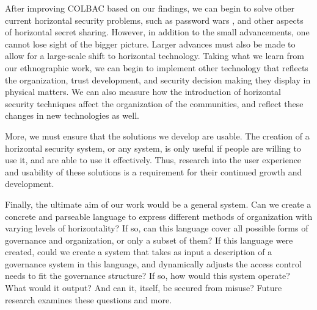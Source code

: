 After improving COLBAC based on our findings, we can begin to solve other
current horizontal security problems, such as password wars
\cite{kavada2020counterpublics}, and other aspects of horizontal secret sharing.
However, in addition to the small advancements, one cannot lose sight of the
bigger picture. Larger advances must also be made to allow for a large-scale
shift to horizontal technology. Taking what we learn from our ethnographic work,
we can begin to implement other technology that reflects the organization, trust
development, and security decision making they display in physical matters. We
can also measure how the introduction of horizontal security techniques affect
the organization of the communities, and reflect these changes in new
technologies as well.

More, we must ensure that the solutions we develop are usable. The creation of
a horizontal security system, or any system,  is only useful if people are
willing to use it, and are able to use it effectively. Thus, research into the
user experience and usability of these solutions is a requirement for their
continued growth and development.

Finally, the ultimate aim of our work would be a general system. Can we create a
concrete and parseable language to express different methods of organization
with varying levels of horizontality? If so, can this language cover all
possible forms of governance and organization, or only a subset of them? If this
language were created, could we create a system that takes as input a
description of a governance system in this language, and dynamically adjusts the
access control needs to fit the governance structure? If so, how would this
system operate? What would it output? And can it, itself, be secured from
misuse? Future research examines these questions and more.


